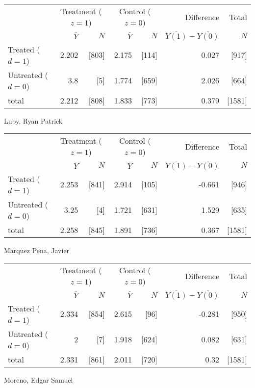 \documentclass[11pt,notitlepage]{article}
\begin{document}
\begin{table}[h!]
\begin{center}
\begin{tabular}{l|rr|rr|rr}
  \hline
 & \multicolumn{2}{c|}{Treatment ($z=1$)} & \multicolumn{2}{c|}{Control ($z=0$)} & Difference & Total \\
 & $\overline{Y}$ & $N$ & $\overline{Y}$ & $N$ & $\overline{Y(1)} - \overline{Y(0)}$ & $N$ \\ 
  \hline
Treated ($d=1$) &  2.202 & [803] & 2.175 & [114] & 0.027 & [917] \\ 
  Untreated ($d=0$) & 3.8 & [5] & 1.774 & [659] & 2.026 & [664] \\ 
  \hline
  total & 2.212 & [808] & 1.833 & [773] & 0.379 & [1581] \\ 
   \hline
\end{tabular}
\end{center}
\end{table}
Luby, Ryan Patrick

\begin{table}[h!]
\begin{center}
\begin{tabular}{l|rr|rr|rr}
  \hline
 & \multicolumn{2}{c|}{Treatment ($z=1$)} & \multicolumn{2}{c|}{Control ($z=0$)} & Difference & Total \\
 & $\overline{Y}$ & $N$ & $\overline{Y}$ & $N$ & $\overline{Y(1)} - \overline{Y(0)}$ & $N$ \\ 
  \hline
Treated ($d=1$) &  2.253 & [841] & 2.914 & [105] & -0.661 & [946] \\ 
  Untreated ($d=0$) & 3.25 & [4] & 1.721 & [631] & 1.529 & [635] \\ 
  \hline
  total & 2.258 & [845] & 1.891 & [736] & 0.367 & [1581] \\ 
   \hline
\end{tabular}
\end{center}
\end{table}
Marquez Pena, Javier

\begin{table}[h!]
\begin{center}
\begin{tabular}{l|rr|rr|rr}
  \hline
 & \multicolumn{2}{c|}{Treatment ($z=1$)} & \multicolumn{2}{c|}{Control ($z=0$)} & Difference & Total \\
 & $\overline{Y}$ & $N$ & $\overline{Y}$ & $N$ & $\overline{Y(1)} - \overline{Y(0)}$ & $N$ \\ 
  \hline
Treated ($d=1$) &  2.334 & [854] & 2.615 & [96] & -0.281 & [950] \\ 
  Untreated ($d=0$) & 2 & [7] & 1.918 & [624] & 0.082 & [631] \\ 
  \hline
  total & 2.331 & [861] & 2.011 & [720] & 0.32 & [1581] \\ 
   \hline
\end{tabular}
\end{center}
\end{table}
Moreno, Edgar Samuel
\end{document}
